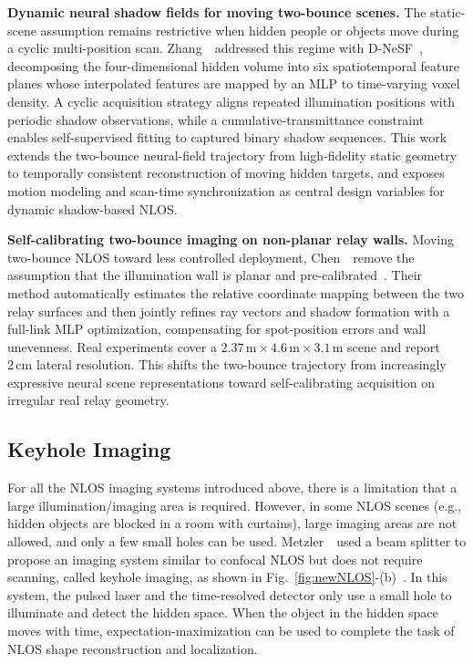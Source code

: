 \vspace{0.8mm}
\noindent \textbf{Dynamic neural shadow fields for moving two-bounce scenes.}
The static-scene assumption remains restrictive when hidden people or objects move during a cyclic multi-position scan. Zhang~\etal~addressed this regime with D-NeSF~\cite{zhangDynamicNeuralShadowFields2026}, decomposing the four-dimensional hidden volume into six spatiotemporal feature planes whose interpolated features are mapped by an MLP to time-varying voxel density. A cyclic acquisition strategy aligns repeated illumination positions with periodic shadow observations, while a cumulative-transmittance constraint enables self-supervised fitting to captured binary shadow sequences. This work extends the two-bounce neural-field trajectory from high-fidelity static geometry to temporally consistent reconstruction of moving hidden targets, and exposes motion modeling and scan-time synchronization as central design variables for dynamic shadow-based NLOS.


\vspace{0.8mm}
\noindent \textbf{Self-calibrating two-bounce imaging on non-planar relay walls.}
Moving two-bounce NLOS toward less controlled deployment, Chen~\etal~remove the assumption that the illumination wall is planar and pre-calibrated~\cite{chenAutoCalibrationTwoBounce2026}. Their method automatically estimates the relative coordinate mapping between the two relay surfaces and then jointly refines ray vectors and shadow formation with a full-link MLP optimization, compensating for spot-position errors and wall unevenness. Real experiments cover a $2.37\,\mathrm{m}\times4.6\,\mathrm{m}\times3.1\,\mathrm{m}$ scene and report $2\,\mathrm{cm}$ lateral resolution. This shifts the two-bounce trajectory from increasingly expressive neural scene representations toward self-calibrating acquisition on irregular real relay geometry.

\subsection{Keyhole Imaging}
For all the NLOS imaging systems introduced above, there is a limitation that a large illumination/imaging area is required.
However, in some NLOS scenes (e.g., hidden objects are blocked in a room with curtains), large imaging areas are not allowed, and only a few small holes can be used.
Metzler~\etal~used a beam splitter to propose an imaging system similar to confocal NLOS but does not require scanning, called keyhole imaging, as shown in Fig.~\ref{fig:newNLOS}-(b)~\cite{metzler_keyhole_2021}. In this system, the pulsed laser and the time-resolved detector only use a small hole to illuminate and detect the hidden space. When the object in the hidden space moves with time, expectation-maximization can be used to complete the task of NLOS shape reconstruction and localization.

